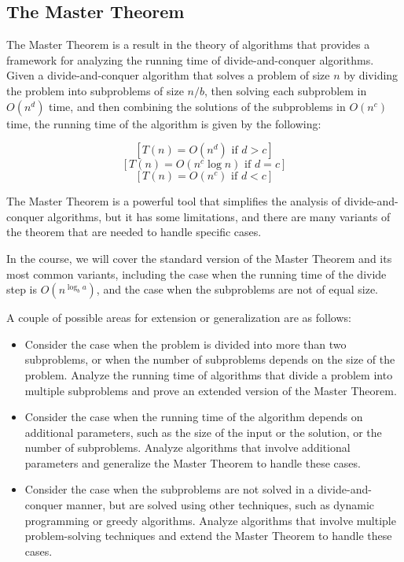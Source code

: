 \documentclass{article}
\begin{document}
\pagebreak

\subsection*{The Master Theorem}
    The Master Theorem is a result in the theory of algorithms that provides a framework for analyzing the running time of divide-and-conquer algorithms. Given a divide-and-conquer algorithm that solves a problem of size $n$ by dividing the problem into subproblems of size $n/b$, then solving each subproblem in $O(n^d)$ time, and then combining the solutions of the subproblems in $O(n^c)$ time, the running time of the algorithm is given by the following:
        
    $$[T(n) = O(n^d)\text{ if }d > c]$$
    $$[T(n) = O(n^c \log n)\text{ if }d = c]$$
    $$[T(n) = O(n^c)\text{ if }d < c]$$
    
    The Master Theorem is a powerful tool that simplifies the analysis of divide-and-conquer algorithms, but it has some limitations, and there are many variants of the theorem that are needed to handle specific cases.
    
    \vspace{3mm}
    In the course, we will cover the standard version of the Master Theorem and its most common variants, including the case when the running time of the divide step is $O(n^{\log_b a})$, and the case when the subproblems are not of equal size.
    
    \vspace{3mm}
    A couple of possible areas for extension or generalization are as follows:
    \begin{itemize}
    \item Consider the case when the problem is divided into more than two subproblems, or when the number of subproblems depends on the size of the problem. Analyze the running time of algorithms that divide a problem into multiple subproblems and prove an extended version of the Master Theorem.
    \item Consider the case when the running time of the algorithm depends on additional parameters, such as the size of the input or the solution, or the number of subproblems. Analyze algorithms that involve additional parameters and generalize the Master Theorem to handle these cases.
    \item Consider the case when the subproblems are not solved in a divide-and-conquer manner, but are solved using other techniques, such as dynamic programming or greedy algorithms. Analyze algorithms that involve multiple problem-solving techniques and extend the Master Theorem to handle these cases.
    \end{itemize}
\end{document}
